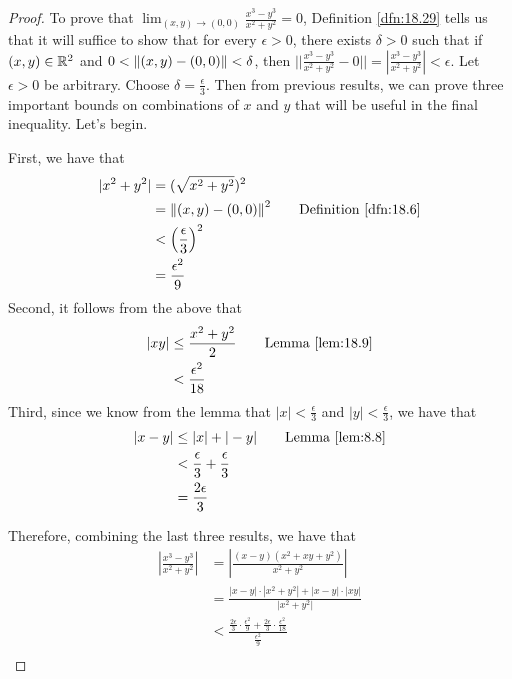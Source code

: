 \documentclass[../main.tex]{subfiles}
\begin{document}
\begin{exercise}
\begin{enumerate}[label={(\alph*)},ref={\theexercise\alph*}]
        \begin{proof}
            To prove that $\lim_{(x,y)\to(0,0)}\frac{x^3-y^3}{x^2+y^2}=0$, Definition \ref{dfn:18.29} tells us that it will suffice to show that for every $\epsilon>0$, there exists $\delta>0$ such that if $(x,y)\in\mathbb{R}^2$ and $0<\norm{(x,y)-(0,0)}<\delta$, then $||\frac{x^3-y^3}{x^2+y^2}-0||=|\frac{x^3-y^3}{x^2+y^2}|<\epsilon$. Let $\epsilon>0$ be arbitrary. Choose $\delta=\frac{\epsilon}{3}$. Then from previous results, we can prove three important bounds on combinations of $x$ and $y$ that will be useful in the final inequality. Let's begin.\par
            First, we have that
            \begin{align*}
                |x^2+y^2| &= (\sqrt{x^2+y^2})^2\\
                &= \norm{(x,y)-(0,0)}^2\tag*{Definition \ref{dfn:18.6}}\\
                &< \left( \frac{\epsilon}{3} \right)^2\\
                &= \frac{\epsilon^2}{9}
            \end{align*}
            Second, it follows from the above that
            \begin{align*}
                |xy| &\leq \frac{x^2+y^2}{2}\tag*{Lemma \ref{lem:18.9}}\\
                &< \frac{\epsilon^2}{18}
            \end{align*}
            Third, since we know from the lemma that $|x|<\frac{\epsilon}{3}$ and $|y|<\frac{\epsilon}{3}$, we have that
            \begin{align*}
                |x-y| &\leq |x|+|-y|\tag*{Lemma \ref{lem:8.8}}\\
                &< \frac{\epsilon}{3}+\frac{\epsilon}{3}\\
                &= \frac{2\epsilon}{3}
            \end{align*}\par
            Therefore, combining the last three results, we have that
            \begin{align*}
                \left| \frac{x^3-y^3}{x^2+y^2} \right| &= \left| \frac{(x-y)(x^2+xy+y^2)}{x^2+y^2} \right|\\
                &= \frac{|x-y|\cdot|x^2+y^2|+|x-y|\cdot|xy|}{|x^2+y^2|}\\
                &< \frac{\frac{2\epsilon}{3}\cdot\frac{\epsilon^2}{9}+\frac{2\epsilon}{3}\cdot\frac{\epsilon^2}{18}}{\frac{\epsilon^2}{9}}\\

\end{align*}
\end{proof}
\end{enumerate}
\end{exercise}
\end{document}
